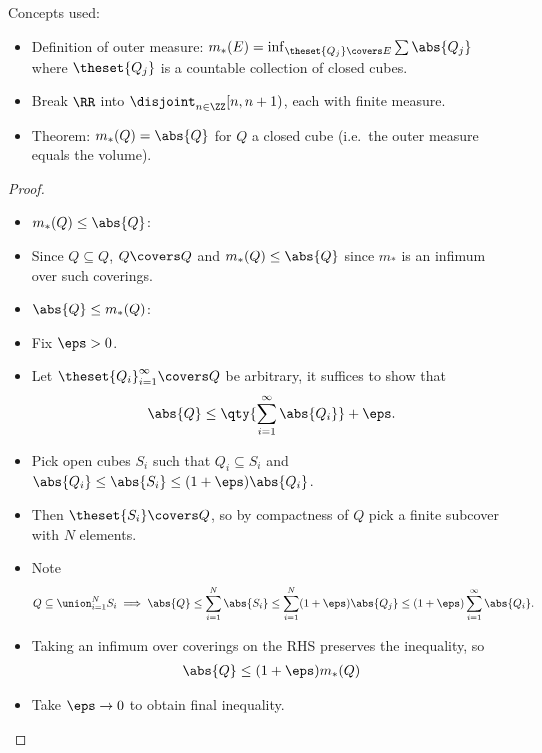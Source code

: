 \begin{solution}

Concepts used:

\begin{itemize}
\tightlist
\item
  Definition of outer measure:
  \(m_*(E) = \inf_{\theset{Q_j} \covers E} \sum \abs {Q_j}\) where
  \(\theset{Q_j}\) is a countable collection of closed cubes.
\item
  Break \(\RR\) into \(\disjoint_{n\in \ZZ} [n, n+1)\), each with finite
  measure.
\item
  Theorem: \(m_*(Q) = \abs{Q}\) for \(Q\) a closed cube (i.e.~the outer
  measure equals the volume).
\end{itemize}

\begin{proof}

\hfill

\begin{itemize}
\item
  \(m_*(Q) \leq \abs{Q}\):
\item
  Since \(Q\subseteq Q\), \(Q\covers Q\) and \(m_*(Q) \leq \abs{Q}\)
  since \(m_*\) is an infimum over such coverings.
\item
  \(\abs{Q} \leq m_*(Q)\):
\item
  Fix \(\eps > 0\).
\item
  Let \(\theset{Q_i}_{i=1}^\infty \covers Q\) be arbitrary, it suffices
  to show that
  \begin{align*}\abs{Q} \leq \qty{\sum_{i=1}^\infty \abs{Q_i}} + \eps.\end{align*}
\item
  Pick open cubes \(S_i\) such that \(Q_i\subseteq S_i\) and
  \(\abs{Q_i} \leq \abs{S_i} \leq (1+\eps)\abs{Q_i}\).
\item
  Then \(\theset{S_i} \covers Q\), so by compactness of \(Q\) pick a
  finite subcover with \(N\) elements.
\item
  Note
  \begin{align*}
  Q \subseteq \union_{i=1}^N S_i \implies \abs{Q} \leq \sum_{i=1}^N \abs{S_i} \leq \sum_{i=1}^N (1+\eps) \abs{Q_j} \leq (1+\eps)\sum_{i=1}^\infty \abs{Q_i } 
  .\end{align*}
\item
  Taking an infimum over coverings on the RHS preserves the inequality,
  so
  \begin{align*}\abs{Q} \leq (1+\eps) m_*(Q)\end{align*}
\item
  Take \(\eps\to 0\) to obtain final inequality.
\end{itemize}


\end{proof}
\end{solution}
